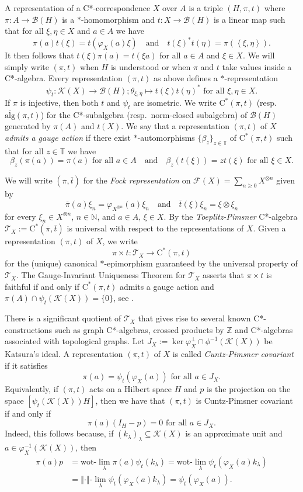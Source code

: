 \documentclass[11pt, draft]{amsart}
\numberwithin{equation}{section}
\theoremstyle{plain}
\theoremstyle{definition}
\theoremstyle{remark}
\newcommand{\B}{{\mathcal{B}}}
\newcommand{\F}{{\mathcal{F}}}
\newcommand{\K}{{\mathcal{K}}}
\newcommand{\T}{{\mathcal{T}}}
\def\be{\beta}
\def\la{\lambda}
\newcommand\vphi{\varphi}
\newcommand{\bN}{\mathbb{N}}
\newcommand{\bT}{\mathbb{T}}
\newcommand{\bZ}{\mathbb{Z}}
\newcommand{\foral}{\text{ for all }}
\newcommand{\qand}{\quad\text{and}\quad}
\newcommand{\ca}{\mathrm{C}^*}
\newcommand{\ol}{\overline}
\newcommand{\sca}[1]{\left\langle#1\right\rangle} %
\newcommand{\nor}[1]{\left\Vert #1\right\Vert} %
\begin{document}
A representation of a C*-correspondence $X$ over $A$ is a triple $(H,\pi,t)$ where $\pi \colon A\to \B(H)$ is a $*$-homomorphism and $t \colon X\to \B(H)$ is a linear map such that for all $\xi,\eta \in X$ and $a\in A$ we have
\[
\pi(a)t(\xi)=t(\varphi_X(a)\xi)
\qand
t(\xi)^* t(\eta) = \pi(\sca{\xi,\eta}).
\]
It then follows that $t(\xi) \pi(a) = t(\xi a)$ for all $a \in A$ and $\xi \in X$.  
We will simply write $(\pi,t)$ when $H$ is understood or when $\pi$ and $t$ take values inside a C*-algebra. 
Every representation $(\pi,t)$ as above defines a $*$-representation 
\[
\psi_t \colon \K(X)\to \B(H); \theta_{\xi, \eta} \mapsto t(\xi) t(\eta)^*
\foral \xi, \eta \in X.
\] 
If $\pi$ is injective, then both $t$ and $\psi_t$ are isometric.
We write $\ca(\pi,t)$ (resp.\ $\ol{\text{alg}}(\pi,t)$) for the C*-subalgebra (resp.\ norm-closed subalgebra) of $\B(H)$ generated by $\pi(A)$ and $t(X)$.
We say that a representation $(\pi,t)$ of $X$ \emph{admits a gauge action} if there exist $*$-automorphisms $\{\be_z\}_{z\in\bT}$ of $\ca(\pi,t)$ such that for all $z \in \bT$ we have
\[
\be_z(\pi(a))=\pi(a) \foral a \in A \qand \be_z(t(\xi))=zt(\xi) \foral \xi \in X.
\]

We will write $(\ol{\pi}, \ol{t})$ for the \emph{Fock representation} on $\F(X) = \sum_{n \geq 0} X^{\otimes n}$ given by
\[
\ol{\pi}(a) \xi_n = \vphi_{X^{\otimes n}}(a) \xi_n
\qand
\ol{t}(\xi) \xi_n = \xi \otimes \xi_n
\]
for every $\xi_n \in X^{\otimes n}$, $n \in \bN$, and $a \in A$, $\xi \in X$.
By \cite{Kat04} the \emph{Toeplitz-Pimsner} C*-algebra $\T_X := \ca(\ol{\pi}, \ol{t})$ is universal with respect to the representations of $X$.
Given a representation $(\pi,t)$ of $X$, we write
\[
\pi\times t\colon\T_X\to\ca(\pi,t)
\]
for the (unique) canonical $*$-epimorphism guaranteed by the universal property of $\T_X$. 
The Gauge-Invariant Uniqueness Theorem for $\T_X$ asserts that $\pi \times t$ is faithful if and only if $\ca(\pi,t)$ admits a gauge action and $\pi(A) \cap \psi_t(\K(X)) = \{0\}$, see \cite[Theorem 6.2]{Kat04}.

There is a significant quotient of $\T_X$ that gives rise to several known C*-constructions such as graph C*-algebras, crossed products by $\bZ$ and C*-algebras associated with topological graphs.
Let $J_X := \ker\vphi_X^\perp \cap \phi^{-1}(\K(X))$ be Katsura's ideal.
A representation $(\pi,t)$ of $X$ is called \emph{Cuntz-Pimsner covariant} if it satisfies
\[
\pi(a)= \psi_t(\vphi_X(a)) \foral a \in J_X.
\]
Equivalently, if $(\pi,t)$ acts on a Hilbert space $H$ and $p$ is the projection on the space $[\psi_t(\K(X))H]$, then we have that $(\pi,t)$ is Cuntz-Pimsner covariant if and only if
\[
\pi(a)(I_H - p) = 0 \foral a \in J_X.
\]
Indeed, this follows because, if $(k_\la)_{\la} \subseteq \K(X)$ is an approximate unit and $a \in \vphi_X^{-1}(\K(X))$, then
\begin{align*}
\pi(a) p 
& = \text{wot-}\lim_\la \pi(a) \psi_t(k_\la) 
= \text{wot-}\lim_\la \psi_{t}(\vphi_X(a) k_\la) \\
&=
\text{$\nor{\cdot}$-}\lim_\la \psi_{t}(\vphi_X(a) k_\la) 
= \psi_{t}(\vphi_X(a)).
\end{align*}
\end{document}
